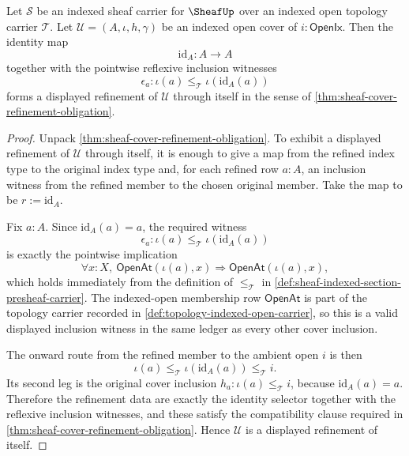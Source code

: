 \begin{theorem}
\label{thm:sheaf-cover-self-refinement}
Let $\mathcal{S}$ be an indexed sheaf carrier for $\SheafUp$ over an indexed open topology carrier $\mathcal{T}$. Let $\mathcal{U}=(A,\iota,h,\gamma)$ be an indexed open cover of $i:\mathsf{OpenIx}$. Then the identity map
$$
\mathrm{id}_A:A\to A
$$
together with the pointwise reflexive inclusion witnesses
$$
\epsilon_a:\iota(a)\le_{\mathcal{T}}\iota(\mathrm{id}_A(a))
$$
forms a displayed refinement of $\mathcal{U}$ through itself in the sense of \autoref{thm:sheaf-cover-refinement-obligation}.
\end{theorem}
\begin{proof}
Unpack \autoref{thm:sheaf-cover-refinement-obligation}. To exhibit a displayed refinement of $\mathcal{U}$ through itself, it is enough to give a map from the refined index type to the original index type and, for each refined row $a:A$, an inclusion witness from the refined member to the chosen original member. Take the map to be $r:=\mathrm{id}_A$.

Fix $a:A$. Since $\mathrm{id}_A(a)=a$, the required witness
$$
\epsilon_a:\iota(a)\le_{\mathcal{T}}\iota(\mathrm{id}_A(a))
$$
is exactly the pointwise implication
$$
\forall x:X,\ \mathsf{OpenAt}(\iota(a),x)\Longrightarrow \mathsf{OpenAt}(\iota(a),x),
$$
which holds immediately from the definition of $\le_{\mathcal{T}}$ in \autoref{def:sheaf-indexed-section-presheaf-carrier}. The indexed-open membership row $\mathsf{OpenAt}$ is part of the topology carrier recorded in \autoref{def:topology-indexed-open-carrier}, so this is a valid displayed inclusion witness in the same ledger as every other cover inclusion.

The onward route from the refined member to the ambient open $i$ is then
$$
\iota(a)\le_{\mathcal{T}}\iota(\mathrm{id}_A(a))\le_{\mathcal{T}} i.
$$
Its second leg is the original cover inclusion $h_a:\iota(a)\le_{\mathcal{T}} i$, because $\mathrm{id}_A(a)=a$. Therefore the refinement data are exactly the identity selector together with the reflexive inclusion witnesses, and these satisfy the compatibility clause required in \autoref{thm:sheaf-cover-refinement-obligation}. Hence $\mathcal{U}$ is a displayed refinement of itself.
\end{proof}

